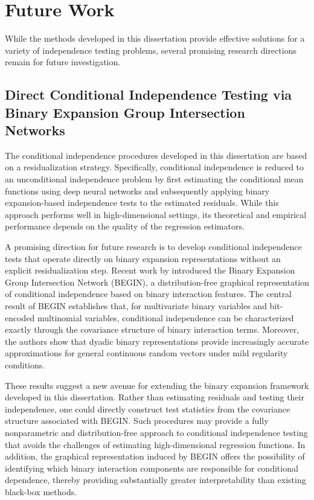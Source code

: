 \documentclass[12pt,reqno,oneside]{amsbook}
\theoremstyle{definition}
\theoremstyle{remark}
\begin{document}
\section{Future Work}

While the methods developed in this dissertation provide effective solutions for a variety of independence testing problems, several promising research directions remain for future investigation.%

\subsection{Direct Conditional Independence Testing via Binary Expansion Group Intersection Networks}

The conditional independence procedures developed in this dissertation are
based on a residualization strategy. Specifically, conditional independence is
reduced to an unconditional independence problem by first estimating the
conditional mean functions using deep neural networks and subsequently applying
binary expansion-based independence tests to the estimated residuals. While
this approach performs well in high-dimensional settings, its theoretical and
empirical performance depends on the quality of the regression estimators.

A promising direction for future research is to develop conditional
independence tests that operate directly on binary expansion representations
without an explicit residualization step. Recent work by
\citet{zhou2026binaryexpansiongroupintersection} introduced the Binary Expansion Group Intersection
Network (BEGIN), a distribution-free graphical representation of conditional
independence based on binary interaction features. The central result of BEGIN
establishes that, for multivariate binary variables and bit-encoded
multinomial variables, conditional independence can be characterized exactly
through the covariance structure of binary interaction terms. Moreover, the
authors show that dyadic binary representations provide increasingly accurate
approximations for general continuous random vectors under mild regularity
conditions. \citep{zhou2026binaryexpansiongroupintersection}

These results suggest a new avenue for extending the binary expansion
framework developed in this dissertation. Rather than estimating residuals and
testing their independence, one could directly construct test statistics from
the covariance structure associated with BEGIN. Such procedures may provide a
fully nonparametric and distribution-free approach to conditional independence
testing that avoids the challenges of estimating high-dimensional regression
functions. In addition, the graphical representation induced by BEGIN offers
the possibility of identifying which binary interaction components are
responsible for conditional dependence, thereby providing substantially greater
interpretability than existing black-box methods.
\end{document}
